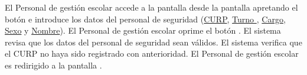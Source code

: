 \begin{UCtrayectoria}

    \UCpaso[\UCactor] El Personal de gestión escolar accede a la pantalla \label{CU33.introduceDatos} desde la pantalla  apretando el botón  e introduce los datos del personal de seguridad (\hyperlink{Personal-de-seguridad.CURP }{CURP}, \hyperlink{personal-de-seguridad.Turno }{Turno }, \hyperlink{ Personal-de-seguridad.Cargo }{Cargo}, \hyperlink{ Personal-de-seguridad.Sexo}{Sexo} y \hyperlink{ Personal-de-seguridad.Nombre}{Nombre}).
    \UCpaso[\UCactor] El Personal de gestión escolar oprime el botón .
    \UCpaso El sistema revisa que los datos del personal de seguridad sean válidos.
    \UCpaso El sistema verifica que el CURP no haya sido registrado con anterioridad.
    \UCpaso[\UCactor] El Personal de gestión escolar es redirigido a la pantalla .

\end{UCtrayectoria}
